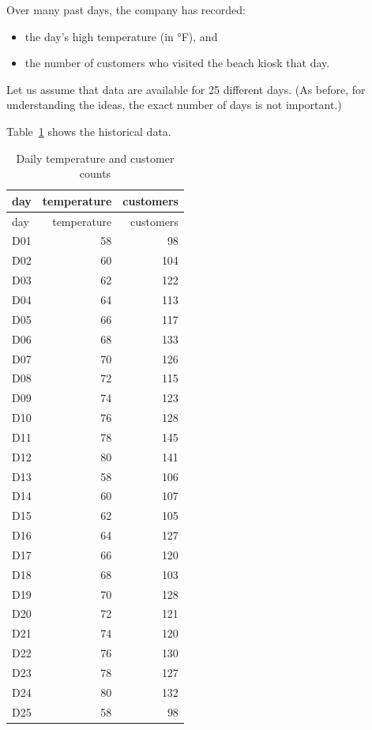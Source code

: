 \documentclass[
  12pt,
  letterpaper,
  DIV=11,
  numbers=noendperiod]{scrreprt}
\begin{document}
Over many past days, the company has recorded:

\begin{itemize}
\item
  the day's high temperature (in °F), and
\item
  the number of customers who visited the beach kiosk that day.
\end{itemize}

Let us assume that data are available for 25 different days. (As before,
for understanding the ideas, the exact number of days is not important.)

Table~\ref{tbl-temp-customers} shows the historical data.

\begin{longtable}[]{@{}lrr@{}}
\caption{Daily temperature and customer
counts}\label{tbl-temp-customers}\tabularnewline
\toprule\noalign{}
day & temperature & customers \\
\midrule\noalign{}
\endfirsthead
\toprule\noalign{}
day & temperature & customers \\
\midrule\noalign{}
\endhead
\bottomrule\noalign{}
\endlastfoot
D01 & 58 & 98 \\
D02 & 60 & 104 \\
D03 & 62 & 122 \\
D04 & 64 & 113 \\
D05 & 66 & 117 \\
D06 & 68 & 133 \\
D07 & 70 & 126 \\
D08 & 72 & 115 \\
D09 & 74 & 123 \\
D10 & 76 & 128 \\
D11 & 78 & 145 \\
D12 & 80 & 141 \\
D13 & 58 & 106 \\
D14 & 60 & 107 \\
D15 & 62 & 105 \\
D16 & 64 & 127 \\
D17 & 66 & 120 \\
D18 & 68 & 103 \\
D19 & 70 & 128 \\
D20 & 72 & 121 \\
D21 & 74 & 120 \\
D22 & 76 & 130 \\
D23 & 78 & 127 \\
D24 & 80 & 132 \\
D25 & 58 & 98 \\
\end{longtable}
\end{document}
